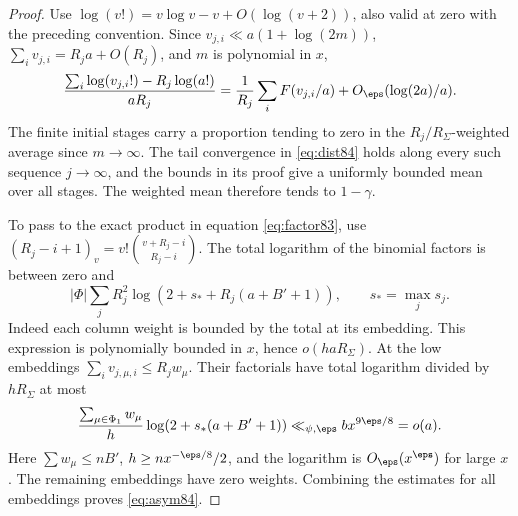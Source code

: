 \documentclass[a4paper,11pt]{article}
\theoremstyle{definition}
\theoremstyle{remark}
\numberwithin{equation}{section}
\begin{document}
\begin{proof}
Use \(\log(v!)=v\log v-v+O(\log(v+2))\), also valid at zero
with the preceding convention. Since \(v_{j,i}\ll a(1+\log(2m))\),
\(\sum_i v_{j,i}=R_ja+O(R_j)\), and \(m\) is polynomial in \(x\),
\[
 \frac{\sum_i\log(v_{j,i}!)-R_j\log(a!)}{aR_j}
       =\frac1{R_j}\sum_i F(v_{j,i}/a)+O_\eps(\log(2a)/a).
\]
The finite initial stages carry a proportion tending to zero in
the \(R_j/R_\Sigma\)-weighted average since \(m\to\infty\).
The tail convergence in \eqref{eq:dist84} holds along every such
sequence \(j\to\infty\), and the bounds in its proof give a
uniformly bounded mean over all stages. The weighted mean
therefore tends to \(1-\gamma\).

To pass to the exact product in equation \ref{eq:factor83}, use
\((R_j-i+1)_v=v!\binom{v+R_j-i}{R_j-i}\).
The total logarithm of the binomial factors is between zero and
\[
 |\Phi|\sum_j R_j^2\log(2+s_*+R_j(a+B'+1)),\qquad s_*=\max_j s_j.
\]
Indeed each column weight is bounded by the total at its embedding.
This expression is polynomially bounded in \(x\), hence
\(o(haR_\Sigma)\). At the low embeddings \(\sum_i v_{j,\mu,i}
\le R_j w_\mu\). Their factorials have total logarithm divided
by \(hR_\Sigma\) at most
\[
 \frac{\sum_{\mu\in\Phi_1} w_\mu}{h}
                  \log(2+s_*(a+B'+1))
                  \ll_{\psi,\eps} b x^{9\eps/8}=o(a).
\]
Here \(\sum w_\mu\le n B'\), \(h\ge nx^{-\eps/8}/2\),
and the logarithm is \(O_\eps(x^\eps)\) for large \(x\).
The remaining embeddings have zero weights. Combining the
estimates for all embeddings proves \eqref{eq:asym84}.
\end{proof}
\end{document}
